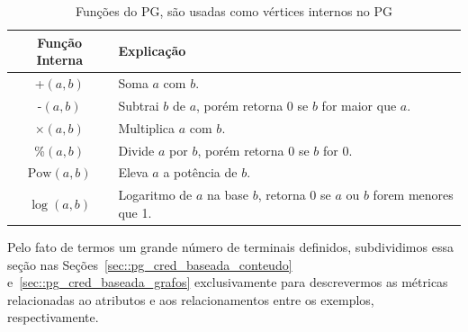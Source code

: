 
\begin{table}[ht*]
\centering
\caption{Funções do \textsc{PG}, são usadas como vértices internos no \textsc{PG}}
\begin{tabular}{|c||l|}
\toprule
    \textbf{Função Interna} & \textbf{Explicação} \\
\midrule
\hline
    +$(a,b)$           & Soma $a$ com $b$. \tabularnewline \hline
    -$(a,b)$           & Subtrai $b$ de $a$, porém retorna 0 se $b$ for maior que $a$.\tabularnewline \hline
    $\times(a,b)$       & Multiplica $a$ com $b$. \tabularnewline \hline
    \%$(a,b)$          & Divide $a$ por $b$, porém retorna 0 se $b$ for 0. \tabularnewline \hline
    $\text{Pow}(a,b)$  & Eleva $a$ a potência de $b$. \tabularnewline \hline
    $\log(a,b) $       & Logaritmo de $a$ na base $b$, retorna 0 se $a$ ou $b$ forem menores que 1. \tabularnewline
\bottomrule
\end{tabular}
\label{table::funcoespg}
\end{table}

Pelo fato de termos um grande número de terminais definidos, subdividimos essa seção nas Seções~\ref{sec::pg_cred_baseada_conteudo} e~\ref{sec::pg_cred_baseada_grafos} exclusivamente para descrevermos as métricas relacionadas ao atributos e aos relacionamentos entre os exemplos, respectivamente.




